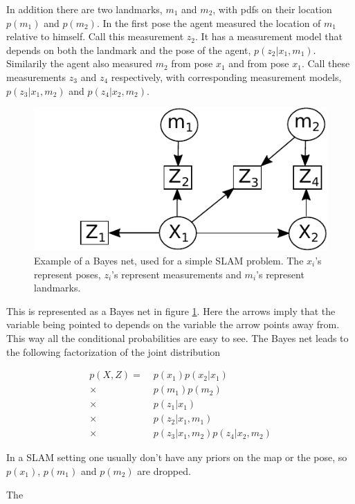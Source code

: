 In addition there are two landmarks, $m_1$ and $m_2$, with pdfs on their location $p(m_1)$ and $p(m_2)$. In the first pose the agent measured the location of $m_1$ relative to himself. Call this measurement $z_2$. It has a measurement model that depends on both the landmark and the pose of the agent, $p(z_2|x_1,m_1)$. Similarily the agent also measured $m_2$ from pose $x_1$ and from pose $x_1$. Call these measurements $z_3$ and $z_4$ respectively, with corresponding measurement models, $p(z_3|x_1,m_2)$ and $p(z_4|x_2,m_2)$. 

\begin{figure}
    \centering
    \includegraphics[width=0.8\linewidth]{0_Images/3_Background/BayesNet.pdf}
    \caption[Example of a Bayes net.]
    {Example of a Bayes net, used for a simple SLAM problem. The $x_i$'s represent poses, $z_i$'s represent measurements and $m_i$'s represent landmarks.}
    \label{Fig:BayesNet}
\end{figure}

This is represented as a Bayes net in figure \ref{Fig:BayesNet}. Here the arrows imply that the variable being pointed to depends on the variable the arrow points away from. This way all the conditional probabilities are easy to see. The Bayes net leads to the following factorization of the joint distribution

\begin{align}
    p(X,Z) = \; & p(x_1)p(x_2|x_1) \\
    \times \; &p(m_1)p(m_2) \nonumber \\
    \times \; &p(z_1|x_1) \nonumber \\
    \times \; &p(z_2|x_1,m_1) \nonumber \\ 
    \times \; &p(z_3|x_1,m_2)p(z_4|x_2,m_2) \nonumber 
\end{align}

In a SLAM setting one usually don't have any priors on the map or the pose, so $p(x_1)$, $p(m_1)$ and $p(m_2)$ are dropped. 

The 